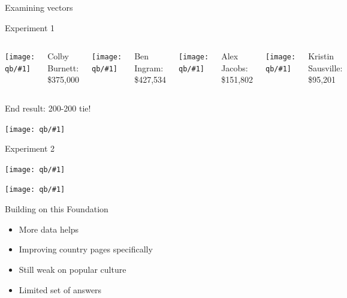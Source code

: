 \documentclass[compress]{beamer}
\newcommand{\gfxq}[2]{
\begin{center}
	\texttt{[image: qb/\#1]}
\end{center}
}
\begin{document}
\begin{frame}{Examining vectors}

  \only<1>{\gfxq{mann}{.65}}
  \only<2>{\gfxq{cabot}{.6}}

\end{frame}

\begin{frame}{Experiment 1}

		\begin{columns}
				\gfxq{colby_jeo}{1.0}
                                Colby Burnett:
                                \$375,000
				\gfxq{ben_jeo}{1.0}
                                Ben Ingram:
                                \$427,534
				\gfxq{alex_jeo}{1.0}
                                Alex Jacobs: \$151,802
				\gfxq{kristin_jeo}{1.0}
                                Kristin Sausville: \$95,201
		\end{columns}

                \pause


                \begin{center}
                End result: 200-200 tie!
                \end{center}

\end{frame}

\begin{frame}[plain]

\gfxq{hsnct1}{1.0}

\end{frame}

\begin{frame}{Experiment 2}

\gfxq{jennings}{.7}

\pause

\vspace{-5cm}
\gfxq{jennings_handshake}{1.0}

\end{frame}


\begin{frame}{Building on this Foundation}

\begin{itemize}
  \item More data helps
  \item Improving country pages specifically
  \item Still weak on popular culture
  \item Limited set of answers
\end{itemize}

\end{frame}
\end{document}
